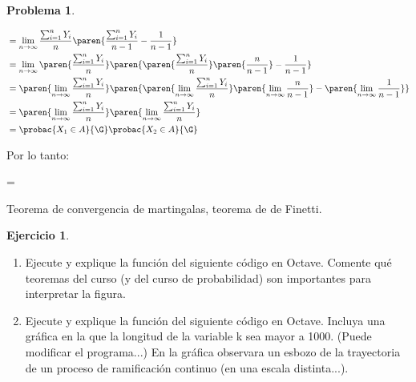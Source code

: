 \documentclass[a5paper,oneside]{amsart}
\theoremstyle{plain}
\theoremstyle{definition}
\newtheorem{problema}{Problema}
\newtheorem{ejercicio}{Ejercicio}
\begin{document}
\begin{problema}
\begin{enumerate}
\begin{align}
&=\lim_{n \rightarrow \infty}\frac{\sum_{i=1}^{n}{Y_i}}{n}\paren{\frac{ \sum_{i=1}^{n}{Y_i}}{n-1}-\frac{1}{n-1}}\notag \\
&=\lim_{n \rightarrow \infty}\paren{\frac{\sum_{i=1}^{n}{Y_i}}{n}}\paren {\paren{ \frac{ \sum_{i=1}^{n}{Y_i}}{n}} \paren{ \frac{n}{n-1}}-\frac{1}{n-1}}\notag \\
&=\paren{\lim_{n \rightarrow \infty}\frac{\sum_{i=1}^{n}{Y_i}}{n}}\paren{\paren{\lim_{n \rightarrow \infty}\frac{\sum_{i=1}^{n}{Y_i}}{n}}\paren{\lim_{n \rightarrow \infty}\frac{n}{n-1}}-\paren{\lim_{n \rightarrow \infty}\frac{1}{n-1}}}\notag \\
&=\paren{\lim_{n \rightarrow \infty}\frac{\sum_{i=1}^{n}{Y_i}}{n}}\paren{\lim_{n \rightarrow \infty}\frac{\sum_{i=1}^{n}{Y_i}}{n}}\notag \\
&=\probac{X_1 \in A}{\G}\probac{X_2 \in A}{\G} \notag
\end{align}

Por lo tanto:
\begin{esn}
=
\end{esn}


\end{enumerate}

Teorema de convergencia de martingalas, teorema de de Finetti.
\end{problema}

\begin{ejercicio}
\mbox{}
\begin{enumerate}
\item Ejecute y explique la funci\'on del siguiente c\'odigo en Octave. Comente qu\'e teoremas del curso (y del curso de probabilidad) son importantes para interpretar la figura.

\item Ejecute y explique la funci\'on del siguiente c\'odigo en Octave. Incluya una gr\'afica en la que la longitud de la variable k sea mayor a 1000. (Puede modificar el programa...) En la gr\'afica observara un esbozo de la trayectoria de un proceso de ramificaci\'on continuo (en una escala distinta...).


\end{enumerate}
\end{ejercicio}
\end{document}

